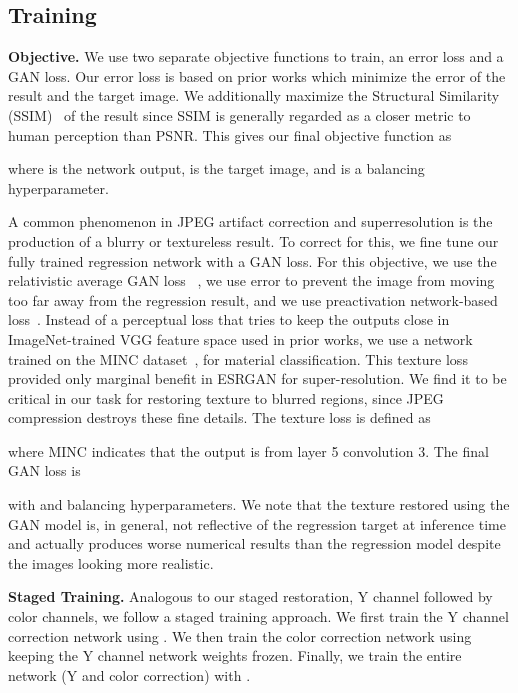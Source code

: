 \documentclass[runningheads]{llncs}
\begin{document}
\subsection{Training}
\label{sec:app:train}
\noindent\textbf{Objective.} We use two separate objective functions to train, an error loss and a GAN loss. Our error loss is based on prior works which minimize the  error of the result and the target image. We additionally
maximize the Structural Similarity (SSIM)~\cite{wang2004image} of the result since SSIM is generally regarded as a closer metric to human perception than PSNR. This gives our final objective function as 

where  is the network output,  is the target image, and  is a balancing hyperparameter.

A common phenomenon in JPEG artifact correction and superresolution is the production of a blurry or textureless result. 
To correct for this, we fine tune our fully trained regression network with a GAN loss. For this objective, we use the relativistic 
average GAN loss ~\cite{jolicoeur2018relativistic}, we use  error to prevent the image from moving too far away from the regression result, and we use preactivation network-based loss~\cite{wang2018esrgan}. Instead of a perceptual loss that tries to keep the outputs close in ImageNet-trained VGG feature space used in prior works, we use a network trained on the MINC dataset~\cite{bell2015material},
for material classification. This texture loss provided only marginal benefit in ESRGAN \cite{wang2018esrgan} for super-resolution. We find it to be critical in our task for restoring texture to blurred regions, since JPEG compression destroys these fine details. The texture loss is defined as 

where MINC indicates that the output is from layer 5 convolution 3.
The final GAN loss is 
 
with  and  balancing hyperparameters. We note that the texture restored using the GAN model is, in general,
not reflective of the regression target at inference time and actually produces worse numerical results than the regression model despite the images looking more realistic.

\noindent\textbf{Staged Training.} Analogous to our staged restoration, Y channel followed by color channels, we follow a staged training approach. We first train the Y channel correction network using . We then train the color correction network using  keeping the Y channel network weights frozen. Finally, we train the entire network (Y and color correction) with . 
\end{document}
